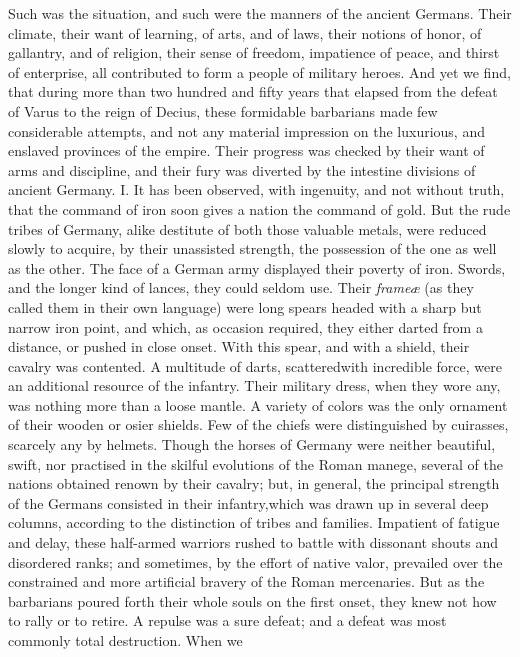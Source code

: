Such was the situation, and such were the manners of the ancient
Germans. Their climate, their want of learning, of arts, and of
laws, their notions of honor, of gallantry, and of religion,
their sense of freedom, impatience of peace, and thirst of
enterprise, all contributed to form a people of military heroes.
And yet we find, that during more than two hundred and fifty
years that elapsed from the defeat of Varus to the reign of
Decius, these formidable barbarians made few considerable
attempts, and not any material impression on the luxurious, and
enslaved provinces of the empire. Their progress was checked by
their want of arms and discipline, and their fury was diverted by
the intestine divisions of ancient Germany. I. It has been
observed, with ingenuity, and not without truth, that the command
of iron soon gives a nation the command of gold. But the rude
tribes of Germany, alike destitute of both those valuable metals,
were reduced slowly to acquire, by their unassisted strength, the
possession of the one as well as the other. The face of a German
army displayed their poverty of iron. Swords, and the longer kind
of lances, they could seldom use. Their \textit{frameæ} (as they called
them in their own language) were long spears headed with a sharp
but narrow iron point, and which, as occasion required, they
either darted from a distance, or pushed in close onset. With
this spear, and with a shield, their cavalry was contented. A
multitude of darts, scattered\footnotemark[72] with incredible force, were an
additional resource of the infantry. Their military dress, when
they wore any, was nothing more than a loose mantle. A variety of
colors was the only ornament of their wooden or osier shields.
Few of the chiefs were distinguished by cuirasses, scarcely any
by helmets. Though the horses of Germany were neither beautiful,
swift, nor practised in the skilful evolutions of the Roman
manege, several of the nations obtained renown by their cavalry;
but, in general, the principal strength of the Germans consisted
in their infantry,\footnotemark[73] which was drawn up in several deep columns,
according to the distinction of tribes and families. Impatient of
fatigue and delay, these half-armed warriors rushed to battle
with dissonant shouts and disordered ranks; and sometimes, by the
effort of native valor, prevailed over the constrained and more
artificial bravery of the Roman mercenaries. But as the
barbarians poured forth their whole souls on the first onset,
they knew not how to rally or to retire. A repulse was a sure
defeat; and a defeat was most commonly total destruction. When we
